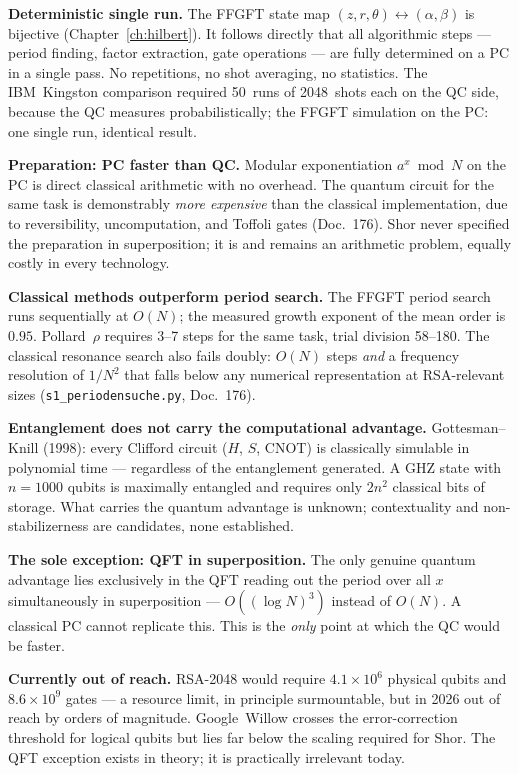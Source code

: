 \textbf{Deterministic single run.}
The FFGFT state map $(z,r,\theta)\leftrightarrow(\alpha,\beta)$ is
bijective (Chapter~\ref{ch:hilbert}). It follows directly that
all algorithmic steps --- period finding, factor extraction, gate
operations --- are fully determined on a PC in a single pass.
No repetitions, no shot averaging, no statistics. The IBM~Kingston
comparison required 50~runs of 2048~shots each on the QC side,
because the QC measures probabilistically; the FFGFT simulation on
the PC: one single run, identical result.

\textbf{Preparation: PC faster than QC.}
Modular exponentiation $a^x\bmod N$ on the PC is direct classical
arithmetic with no overhead. The quantum circuit for the same task
is demonstrably \emph{more expensive} than the classical
implementation, due to reversibility, uncomputation, and Toffoli
gates (Doc.~176). Shor never specified the preparation in
superposition; it is and remains an arithmetic problem, equally
costly in every technology.

\textbf{Classical methods outperform period search.}
The FFGFT period search runs sequentially at $O(N)$; the measured
growth exponent of the mean order is $0{.}95$. Pollard~$\rho$
requires 3--7 steps for the same task, trial division 58--180.
The classical resonance search also fails doubly: $O(N)$ steps
\emph{and} a frequency resolution of $1/N^2$ that falls below any
numerical representation at RSA-relevant sizes
(\texttt{s1\_periodensuche.py}, Doc.~176).

\textbf{Entanglement does not carry the computational advantage.}
Gottesman--Knill (1998): every Clifford circuit ($H$, $S$, CNOT)
is classically simulable in polynomial time --- regardless of the
entanglement generated. A GHZ state with $n = 1000$ qubits is
maximally entangled and requires only $2n^2$ classical bits of
storage. What carries the quantum advantage is unknown; contextuality
and non-stabilizerness are candidates, none established.

\textbf{The sole exception: QFT in superposition.}
The only genuine quantum advantage lies exclusively in the QFT
reading out the period over all $x$ simultaneously in superposition
--- $O((\log N)^3)$ instead of $O(N)$. A classical PC cannot
replicate this. This is the \emph{only} point at which the QC
would be faster.

\textbf{Currently out of reach.}
RSA-2048 would require $4{.}1\times10^6$ physical qubits and
$8{.}6\times10^9$ gates --- a resource limit, in principle
surmountable, but in 2026 out of reach by orders of magnitude.
Google~Willow crosses the error-correction threshold for logical
qubits but lies far below the scaling required for Shor. The
QFT exception exists in theory; it is practically irrelevant today.

